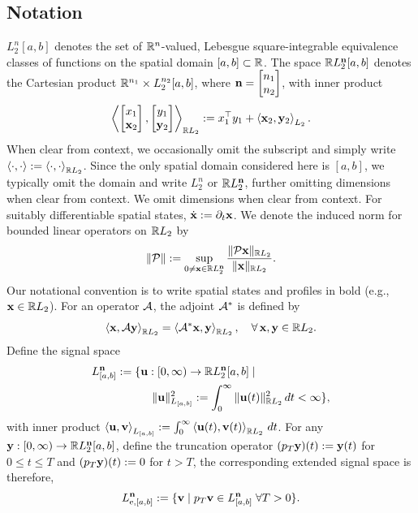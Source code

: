 \subsection{Notation}
$L_2^n[a,b]$ denotes the set of $\mathbb{R}^n$-valued, Lebesgue square-integrable
equivalence classes of functions on the spatial domain $[a,b]\subset\mathbb{R}$. The
space $\mathbb{R} L_2^{\mathbf{n}}[a,b]$ denotes the Cartesian product $\mathbb{R}^{n_1} \times
L_2^{n_2}[a,b]$, where $\mathbf{n} = \begin{bmatrix}n_1 \\ n_2\end{bmatrix}$, with inner product
\begin{equation*}
\left\langle \begin{bmatrix}x_1 \\ \mathbf{x}_2\end{bmatrix}, \begin{bmatrix}y_1 \\ \mathbf{y}_2\end{bmatrix} \right\rangle_{\mathbb{R} L_2}
:= x_1^\top y_1 + \left\langle \mathbf{x}_2, \mathbf{y}_2 \right\rangle_{L_2}.
\end{equation*} When clear from context, we occasionally omit the subscript and
simply write $\left\langle \cdot, \cdot \right\rangle := \left\langle \cdot, \cdot \right\rangle_{\mathbb{R} L_2}$. Since the only
spatial domain considered here is $[a,b]$, we typically omit the domain and
write $L_2^n$ or $\mathbb{R} L_2^{\mathbf{n}}$, further omitting dimensions when clear
from context. We omit dimensions when clear from context.
For suitably differentiable spatial states, $\dot{\mathbf{x}}:=\partial_t\mathbf{x}$.
We denote the induced norm for
bounded linear operators on $\mathbb{R} L_2$ by
\[
\|\mathcal{P}\|
:=\sup_{0\neq\mathbf{x}\in\mathbb{R} L_2^{\mathbf{n}}}
\frac{\|\mathcal{P}\mathbf{x}\|_{\mathbb{R} L_2}}{\|\mathbf{x}\|_{\mathbb{R} L_2}}.
\]
Our notational convention is to write
spatial states and profiles in bold (e.g., $\mathbf{x}\in\mathbb{R} L_2$).
For an operator $\mathcal{A}$, the adjoint $\mathcal{A}^*$ is defined by
\[
\left\langle \mathbf{x}, \mathcal{A} \mathbf{y} \right\rangle_{\mathbb{R} L_2} = \left\langle \mathcal{A}^* \mathbf{x}, \mathbf{y} \right\rangle_{\mathbb{R} L_2},
\quad \forall\, \mathbf{x},\mathbf{y} \in \mathbb{R} L_2.
\]
Define the signal space
\begin{align*}
L_{[a,b]}^{\mathbf{n}}:=\{&\mathbf{u}:[0,\infty)\to\mathbb{R} L_2^{\mathbf{n}}[a,b] \mid\\&\quad\|\mathbf{u}\|_{L_{[a,b]}}^2:=\int_0^{\infty}\|\mathbf{u}(t)\|_{\mathbb{R} L_2}^2\,dt<\infty\}, 
\end{align*}
with inner product $\left\langle \mathbf{u}, \mathbf{v} \right\rangle_{L_{[a,b]}}:=\int_0^{\infty}\left\langle \mathbf{u}(t), \mathbf{v}(t) \right\rangle_{\mathbb{R} L_2}\,dt$. 
For any $\mathbf{y}:[0,\infty)\to\mathbb{R} L_2^{\mathbf{n}}[a,b]$,
define the truncation operator $(p_T\mathbf{y})(t):=\mathbf{y}(t)$ 
for $0\leq t\leq T$ and $(p_T\mathbf{y})(t):=0$ for $t>T$,
the corresponding extended signal space is therefore,
\begin{align*}
L_{{\mathrm{e}},[a,b]}^{\mathbf{n}}:=\{\mathbf{v} \mid p_T\mathbf{v}\in L_{[a,b]}^{\mathbf{n}} \;\forall T>0\}.
\end{align*}

